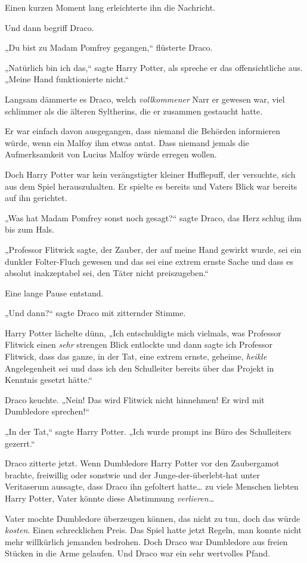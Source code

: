 {Einen kurzen Moment lang erleichterte ihn die Nachricht.

Und dann begriff Draco.

„Du bist zu Madam Pomfrey gegangen,“ flüsterte Draco.

„Natürlich bin ich das,“ sagte Harry Potter, als spreche er das offensichtliche aus. „Meine Hand funktionierte nicht.“

Langsam dämmerte es Draco, welch \emph{vollkommener} Narr er gewesen war, viel schlimmer als die älteren Syltherins, die er zusammen gestaucht hatte.

Er war einfach davon ausgegangen, dass niemand die Behörden informieren würde, wenn ein Malfoy ihm etwas antat. Dass niemand jemals die Aufmerksamkeit von Lucius Malfoy würde erregen wollen.

Doch Harry Potter war kein verängstigter kleiner Hufflepuff, der versuchte, sich aus dem Spiel herauszuhalten. Er spielte es bereits und Vaters Blick war bereits auf ihn gerichtet.

„Was hat Madam Pomfrey sonst noch gesagt?“ sagte Draco, das Herz schlug ihm bis zum Hals.

„Professor Flitwick sagte, der Zauber, der auf meine Hand gewirkt wurde, sei ein dunkler Folter-Fluch gewesen und das sei eine extrem ernste Sache und dass es absolut inakzeptabel sei, den Täter nicht preiszugeben.“

Eine lange Pause entstand.

„Und dann?“ sagte Draco mit zitternder Stimme.

Harry Potter lächelte dünn, „Ich entschuldigte mich vielmals, was Professor Flitwick einen \emph{sehr} strengen Blick entlockte und dann sagte ich Professor Flitwick, dass das ganze, in der Tat, eine extrem ernste, geheime, \emph{heikle} Angelegenheit sei und dass ich den Schulleiter bereits über das Projekt in Kenntnis gesetzt hätte.“

Draco keuchte. „Nein! Das wird Flitwick nicht hinnehmen! Er wird mit Dumbledore sprechen!“

„In der Tat,“ sagte Harry Potter. „Ich wurde prompt ins Büro des Schulleiters gezerrt.“

Draco zitterte jetzt. Wenn Dumbledore Harry Potter vor den Zaubergamot brachte, freiwillig oder sonstwie und der Junge-der-überlebt-hat unter Veritaserum aussagte, dass Draco ihn gefoltert hatte… zu viele Menschen liebten Harry Potter, Vater könnte diese Abstimmung \emph{verlieren…}

Vater mochte Dumbledore überzeugen können, das nicht zu tun, doch das würde \emph{kosten}. Einen schrecklichen Preis. Das Spiel hatte jetzt Regeln, man konnte nicht mehr willkürlich jemanden bedrohen. Doch Draco war Dumbledore aus freien Stücken in die Arme gelaufen. Und Draco war ein sehr wertvolles Pfand.

}
